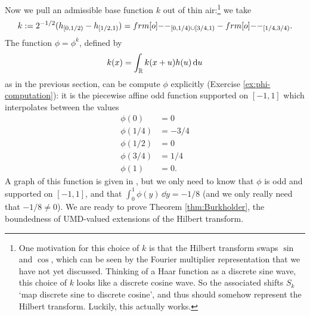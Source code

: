 Now we pull an admissible base function $k$ out of thin air:\footnote{One motivation for this choice of $k$ is that the Hilbert transform swaps $\sin$ and $\cos$, which can be seen by the Fourier multiplier representation that we have not yet discussed. Thinking of a Haar function as a discrete sine wave, this choice of $k$ looks like a discrete cosine wave. So the associated shifts $S_{k}$ `map discrete sine to discrete cosine', and thus should somehow represent the Hilbert transform. Luckily, this actually works.} we take
\begin{equation*}
  k := 2^{-1/2}(h_{[0,1/2)} - h_{[1/2,1)}) = \1_{[0,1/4) \cup [3/4,1)} -\1_{[1/4, 3/4)}.
\end{equation*}
The function $\phi = \phi^{k}$, defined by
\begin{equation*}
  k(x) = \int_{\mathbb{R}} k(x+u)h(u) \, \mathrm{d} u
\end{equation*}
as in the previous section, can be compute $\phi$ explicitly (Exercise \ref{ex:phi-computation}): it is the piecewise affine odd function supported on $[-1,1]$ which interpolates between the values
\begin{equation}\label{eq:phi-1}
  \begin{aligned}
    \phi(0) &= 0 \\
    \phi(1/4) &= -3/4 \\
    \phi(1/2) &= 0 \\
    \phi(3/4) &= 1/4 \\
    \phi(1) &= 0.
  \end{aligned}
\end{equation}
A graph of this function is given in \cite[Figure 5.1]{HNVW16}, but we only need to know that $\phi$ is odd and supported on $[-1,1]$, and that $\int_{0}^{1} \phi(y) \, \dd y = -1/8$ (and we only really need that $-1/8 \neq 0$).
We are ready to prove Theorem \ref{thm:Burkholder}, the boundedness of UMD-valued extensions of the Hilbert transform.

